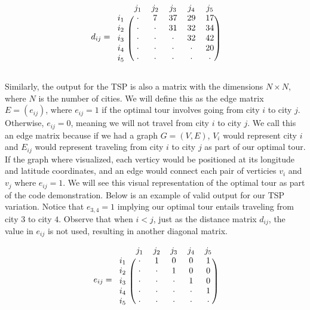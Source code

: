 \documentclass{article}
\begin{document}
\begin{align*}
  d_{ij}=
  \begin{blockarray}{cccccc}
    & j_1 & j_2 & j_3 & j_4 & j_5 \\
  \begin{block}{c(ccccc)}
    i_1 & \cdot & 7 & 37 & 29 & 17 \\
    i_2 & \cdot & \cdot & 31 & 32 & 34 \\
    i_3 & \cdot & \cdot & \cdot & 32 & 42 \\
    i_4 & \cdot & \cdot & \cdot & \cdot & 20 \\
    i_5 & \cdot & \cdot & \cdot & \cdot & \cdot \\
  \end{block}
  \end{blockarray}
\end{align*}

Similarly, the output for the TSP is also a matrix with the dimensions
$N\times N$, where $N$ is the number of cities.  We will define this as
the edge matrix $E = (e_{ij})$, where $e_{ij}=1$ if the optimal tour involves
going from city $i$ to city $j$.  Otherwise, $e_{ij}=0$, meaning we will not
travel from city $i$ to city $j$.  We call this an edge matrix because if
we had a graph $G=(V,E)$, $V_i$ would represent city $i$ and $E_{ij}$ would
represent traveling from city $i$ to city $j$ as part of our optimal tour.
If the graph where visualized, each verticy would be positioned at its
longitude and latitude coordinates, and an edge would connect each pair of
verticies $v_i$ and $v_j$ where $e_{ij}=1$.  We will see this visual
representation of the optimal tour as part of the code demonstration.
Below is an example of valid output for our TSP variation.  Notice that
$e_{3,4}=1$ implying our optimal tour entails traveling from city $3$ to
city $4$.  Observe that when $i<j$, just as the distance matrix $d_{ij}$,
the value in $e_{ij}$ is not used, resulting in another diagonal matrix.
\par

\begin{align*}
  e_{ij}=
  \begin{blockarray}{cccccc}
    & j_1 & j_2 & j_3 & j_4 & j_5 \\
  \begin{block}{c(ccccc)}
    i_1 & \cdot & 1 & 0 & 0 & 1 \\
    i_2 & \cdot & \cdot & 1 & 0 & 0 \\
    i_3 & \cdot & \cdot & \cdot & 1 & 0 \\
    i_4 & \cdot & \cdot & \cdot & \cdot & 1 \\
    i_5 & \cdot & \cdot & \cdot & \cdot & \cdot \\
  \end{block}
  \end{blockarray}
\end{align*}
\end{document}
